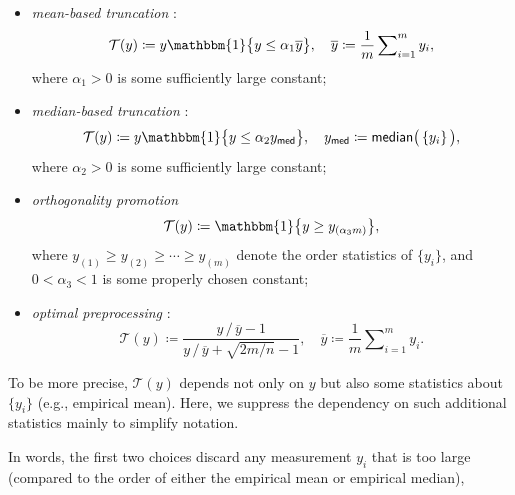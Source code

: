 \begin{itemize}
	\item {\em mean-based truncation} \citep{chen2015solving}:
	\begin{equation}
		\label{eq:trimming}
		\mathcal{T}(y) \coloneqq y \mathbbm{1} \big\{ y \leq \alpha_1 \overline{y} \big\}, \quad
		\overline{y} \coloneqq \frac{1}{m} \sum\nolimits_{i=1}^m y_i,
	\end{equation}
	where $\alpha_1>0$ is some sufficiently large constant;

	\item {\em median-based truncation} \citep{zhang2016provable,zhang2018median}:
	\begin{equation}
		\label{eq:median-truncation}
		\mathcal{T}(y) \coloneqq y \mathbbm{1}\big\{ y \leq \alpha_2 y_{\mathsf{med}} \big\}, \quad
		y_{\mathsf{med}}  \coloneqq \mathsf{median}\big(\, \{ y_i \} \,\big),
	\end{equation}
	where $\alpha_2>0$ is some sufficiently large constant; 	
	
	\item {\em orthogonality promotion} \citep{wang2017solving,duchi2019solving}
	\begin{equation}
		\label{eq:TAF}
		\mathcal{T}(y) \coloneqq  \mathbbm{1}\big\{ y \geq y_{(\alpha_3 m)} \big\},
	\end{equation}
	where $y_{(1)}\geq y_{(2)}\geq \cdots \geq y_{(m)}$ denote the order statistics of $\{y_i\}$,
	and $0<\alpha_3<1$ is some properly chosen constant;

	\item {\em optimal preprocessing} \citep{mondelli2017fundamental,luo2019optimal}:
	\begin{equation}
		\label{eq:optimal-truncation}
		\mathcal{T}(y) \coloneqq \frac{y\,/\,\overline{y} -1}{ y\,/\,\overline{y} +\sqrt{2m/n}-1},\quad
		\overline{y} \coloneqq \frac{1}{m} \sum\nolimits_{i=1}^m y_i.
	\end{equation}
		
\end{itemize}
%
\begin{remark}
	To be more precise, $\mathcal{T}(y)$ depends not only on $y$ but also some statistics about $\{y_i\}$ (e.g., empirical mean).
	Here, we suppress the dependency on such additional statistics mainly to simplify notation.
\end{remark}
%
In words, the first two choices discard any measurement $y_i$ that is too large (compared to the order of either the empirical mean or empirical median),
